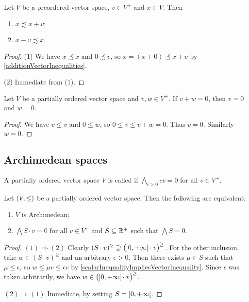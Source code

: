 \begin{lemma} \label{positiveVectorAddition}
Let $V$ be a preordered vector space, $v\in V^+$ and $x\in V$. Then
\begin{enumerate}
\item $x \precsim x+v$;
\item $x - v \precsim x$.
\end{enumerate}
\end{lemma}
\begin{proof}
(1) We have $x\precsim x$ and $0\precsim v$, so $x = (x+0)\precsim x+v$ by \ref{additionVectorInequalities}.

(2) Immediate from (1).
\end{proof}

\begin{lemma} \label{positiveElementsSumToZeroImpliesZero}
Let $V$ be a partially ordered vector space and $v,w\in V^+$. If $v+w = 0$, then $v = 0$ and $w = 0$.
\end{lemma}
\begin{proof}
We have $v \leq v$ and $0\leq w$, so $0\leq v\leq v+w = 0$. Thus $v = 0$. Similarly $w = 0$.
\end{proof}

\subsection{Archimedean spaces}
\begin{definition}
A partially ordered vector space $V$ is called  if $\bigwedge_{\epsilon > 0}\epsilon v = 0$ for all $v\in V^+$.
\end{definition}

\begin{lemma} \label{ArchimedeanEquivalents}
Let $\sSet{V,\leq}$ be a partially ordered vector space. Then the following are equivalent:
\begin{enumerate}
\item $V$ is Archimedean;
\item $\bigwedge S\cdot v = 0$ for all $v\in V^+$ and $S\subseteq \mathbb{R}^+$ such that $\bigwedge S = 0$.
\end{enumerate}
\end{lemma}
\begin{proof}
$(1) \Rightarrow (2)$ Clearly $(S\cdot v)^\geq \supseteq \big( \interval[o]{0,+\infty}\cdot v\big)^\geq$. For the other inclusion, take $w\in (S\cdot v)^\geq$ and an arbitrary $\epsilon > 0$. Then there exists $\mu \in S$ such that $\mu \leq \epsilon$, so $w \leq \mu v \leq \epsilon v$ by \ref{scalarInequalityImpliesVectorInequality}. Since $\epsilon$ was taken arbitrarily, we have $w\in \big( \interval[o]{0,+\infty}\cdot v\big)^\geq$.

$(2) \Rightarrow (1)$ Immediate, by setting $S = \interval[o]{0,+\infty}$.
\end{proof}

